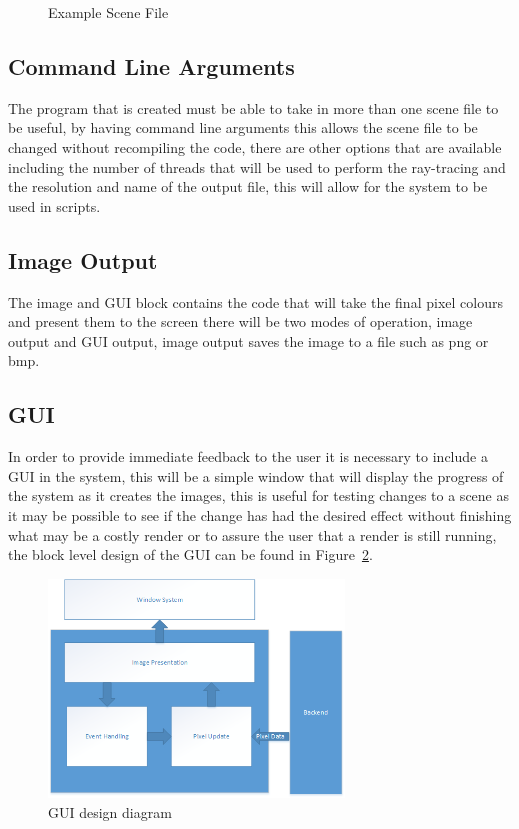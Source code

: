 \begin{figure}

\label{fig:scene_file_example}
\caption{Example Scene File}
\end{figure}

\subsection{Command Line Arguments}
The program that is created must be able to take in more than one scene file to be useful, by having command
line arguments this allows the scene file to be changed without recompiling the code, there are other options
that are available including the number of threads that will be used to perform the ray-tracing and the
resolution and name of the output file, this will allow for the system to be used in scripts.

\subsection{Image Output}
The image and GUI block contains the code that will take the final pixel colours and present them to the screen
there will be two modes of operation, image output and GUI output, image output saves the image to a file such
as png or bmp.

\subsection{GUI}
In order to provide immediate feedback to the user it is necessary to include a GUI in the system, this will
be a simple window that will display the progress of the system as it creates the images, this is useful
for testing changes to a scene as it may be possible to see if the change has had the desired effect without
finishing what may be a costly render or to assure the user that a render is still running, the block level
design of the GUI can be found in Figure~\ref{fig:gui_design}.

\begin{figure}
\centering
\includegraphics[width=0.7\textwidth]{./images/gui_design.png}
\caption{GUI design diagram}
\label{fig:gui_design}
\end{figure}

